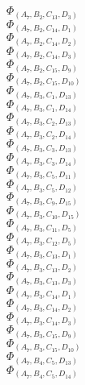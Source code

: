 \documentclass[14pt]{article}
\begin{document}
    $\Phi_{({A}_{7}, {B}_{2}, {C}_{13}, {D}_{3})}$ \\ 
    $\Phi_{({A}_{7}, {B}_{2}, {C}_{14}, {D}_{1})}$ \\ 
    $\Phi_{({A}_{7}, {B}_{2}, {C}_{14}, {D}_{2})}$ \\ 
    $\Phi_{({A}_{7}, {B}_{2}, {C}_{14}, {D}_{3})}$ \\ 
    $\Phi_{({A}_{7}, {B}_{2}, {C}_{15}, {D}_{9})}$ \\ 
    $\Phi_{({A}_{7}, {B}_{2}, {C}_{15}, {D}_{10})}$ \\ 
    $\Phi_{({A}_{7}, {B}_{3}, {C}_{1}, {D}_{13})}$ \\ 
    $\Phi_{({A}_{7}, {B}_{3}, {C}_{1}, {D}_{14})}$ \\ 
    $\Phi_{({A}_{7}, {B}_{3}, {C}_{2}, {D}_{13})}$ \\ 
    $\Phi_{({A}_{7}, {B}_{3}, {C}_{2}, {D}_{14})}$ \\ 
    $\Phi_{({A}_{7}, {B}_{3}, {C}_{3}, {D}_{13})}$ \\ 
    $\Phi_{({A}_{7}, {B}_{3}, {C}_{3}, {D}_{14})}$ \\ 
    $\Phi_{({A}_{7}, {B}_{3}, {C}_{5}, {D}_{11})}$ \\ 
    $\Phi_{({A}_{7}, {B}_{3}, {C}_{5}, {D}_{12})}$ \\ 
    $\Phi_{({A}_{7}, {B}_{3}, {C}_{9}, {D}_{15})}$ \\ 
    $\Phi_{({A}_{7}, {B}_{3}, {C}_{10}, {D}_{15})}$ \\ 
    $\Phi_{({A}_{7}, {B}_{3}, {C}_{11}, {D}_{5})}$ \\ 
    $\Phi_{({A}_{7}, {B}_{3}, {C}_{12}, {D}_{5})}$ \\ 
    $\Phi_{({A}_{7}, {B}_{3}, {C}_{13}, {D}_{1})}$ \\ 
    $\Phi_{({A}_{7}, {B}_{3}, {C}_{13}, {D}_{2})}$ \\ 
    $\Phi_{({A}_{7}, {B}_{3}, {C}_{13}, {D}_{3})}$ \\ 
    $\Phi_{({A}_{7}, {B}_{3}, {C}_{14}, {D}_{1})}$ \\ 
    $\Phi_{({A}_{7}, {B}_{3}, {C}_{14}, {D}_{2})}$ \\ 
    $\Phi_{({A}_{7}, {B}_{3}, {C}_{14}, {D}_{3})}$ \\ 
    $\Phi_{({A}_{7}, {B}_{3}, {C}_{15}, {D}_{9})}$ \\ 
    $\Phi_{({A}_{7}, {B}_{3}, {C}_{15}, {D}_{10})}$ \\ 
    $\Phi_{({A}_{7}, {B}_{4}, {C}_{5}, {D}_{13})}$ \\ 
    $\Phi_{({A}_{7}, {B}_{4}, {C}_{5}, {D}_{14})}$ \\ 
\end{document}
